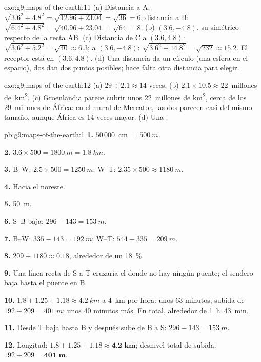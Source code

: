 \begin{solution}{exo:g9:maps-of-the-earth:11}
(a) Distancia a A: $\sqrt{3.6^2 + 4.8^2} = \sqrt{12.96 + 23.04} =
\sqrt{36} = 6$; distancia a B: $\sqrt{6.4^2 + 4.8^2} = \sqrt{40.96 +
23.04} = \sqrt{64} = 8$. (b) $(3.6, -4.8)$, su simétrico respecto de la
recta AB. (c) Distancia de C a $(3.6, 4.8)$: $\sqrt{3.6^2 + 5.2^2} =
\sqrt{40} \approx 6.3$; a $(3.6, -4.8)$: $\sqrt{3.6^2 + 14.8^2} =
\sqrt{232} \approx 15.2$. El receptor está en $(3.6, 4.8)$. (d) Una
distancia da un círculo (una esfera en el espacio), dos dan dos puntos
posibles; hace falta otra distancia para elegir.
\end{solution}

\begin{solution}{exo:g9:maps-of-the-earth:12}
(a) $29 \div 2.1 \approx 14$ veces. (b) $2.1 \times 10.5 \approx
22$~millones de~\unit{km^2}. (c) Groenlandia parece cubrir unos
22~millones de \unit{km^2}, cerca de los 29~millones de África: en el 
mural de Mercator, las dos parecen casi del mismo tamaño, aunque África es
14 veces mayor. (d) Una .
\end{solution}

\begin{solution}{pb:g9:maps-of-the-earth:1}
\textbf{1.} $50\,000$~cm $= \qty{500}{m}$.

\textbf{2.} $3.6 \times 500 = \qty{1800}{m} = \qty{1.8}{km}$.

\textbf{3.} B--W: $2.5 \times 500 = \qty{1250}{m}$; W--T: $2.35 \times 500
\approx \qty{1180}{m}$.

\textbf{4.} Hacia el noreste.

\textbf{5.} \qty{50}{m}.

\textbf{6.} S--B baja: $296 - 143 = \qty{153}{m}$.

\textbf{7.} B--W: $335 - 143 = \qty{192}{m}$; W--T: $544 - 335 =
\qty{209}{m}$.

\textbf{8.} $209 \div 1180 \approx 0.18$, alrededor de un \qty{18}{\%}.

\textbf{9.} Una línea recta de S a T cruzaría el  donde no hay ningún
puente; el sendero baja hasta el puente en B.

\textbf{10.} $1.8 + 1.25 + 1.18 \approx \qty{4.2}{km}$ a \qty{4}{km} por
hora: unos 63 minutos; subida de $192 + 209 = \qty{401}{m}$: unos 40
minutos más. En total, alrededor de 1~h~43~min.

\textbf{11.} Desde T baja hasta B y después sube de B a S: $296 -
143 = \qty{153}{m}$.

\textbf{12.} Longitud: $1.8 + 1.25 + 1.18 \approx \textbf{4.2 km}$;
desnivel total de subida: $192 + 209 = \textbf{401 m}$.
\end{solution}
